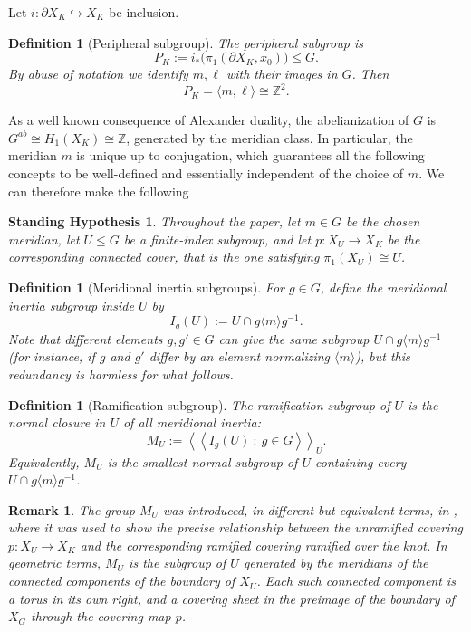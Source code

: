 \documentclass[11pt]{article}
\newtheorem{definition}[theorem]{Definition}
\newtheorem{remark}[theorem]{Remark}
\newtheorem{hyp}{Standing Hypothesis}
\begin{document}
	Let $i:\partial X_K\hookrightarrow X_K$ be inclusion.
	
	\begin{definition}[Peripheral subgroup]
		The \emph{peripheral subgroup} is
		\[ P_K := i_*\big(\pi_1(\partial X_K,x_0)\big)\le G.\]
		By abuse of notation we identify $m,\ell$ with their images in $G$. Then
		\[P_K=\langle m,\ell\rangle \cong \mathbb Z^2.\]
	\end{definition}
	
	As a well known consequence of Alexander duality, the abelianization of $G$ is
	$G^{ab}\cong H_1(X_K)\cong \mathbb Z$, generated by the meridian class. In particular, the meridian $m$ is unique up to conjugation, which guarantees all the following concepts to be well-defined and essentially independent of the choice of $m$. We can therefore make the following
	
	\begin{hyp}
		Throughout the paper, let $m\in G$ be the chosen meridian, let $U\le G$ be a finite-index subgroup, and let $p:X_U\to X_K$ be the corresponding connected cover, that is the one satisfying $\pi_1(X_U)\cong U$.
	\end{hyp}
	
	\begin{definition}[Meridional inertia subgroups]
		For $g\in G$, define the \emph{meridional inertia subgroup} inside $U$ by
		\[ I_g(U):= U\cap g\langle m\rangle g^{-1}.\]
		Note that different elements $g,g'\in G$ can give the same subgroup $U\cap g\langle m\rangle g^{-1}$ (for instance, if $g$ and $g'$ differ by an element normalizing $\langle m\rangle$), but this redundancy is harmless for what follows.
	\end{definition}
	
	\begin{definition}[Ramification subgroup]
		The \emph{ramification subgroup} of $U$ is the normal closure in $U$ of all meridional inertia:
		\[M_U := \left\langle\!\left\langle I_g(U)\ :\ g\in G \right\rangle\!\right\rangle_U.\]
		Equivalently, $M_U$ is the smallest normal subgroup of $U$ containing every $U\cap g\langle m\rangle g^{-1}$.
	\end{definition}
	\begin{remark}
		The group $M_U$ was introduced, in different but equivalent terms, in \cite{PasiniClassifying, PasiniAmbClassSp}, where it was used to show the precise relationship between the unramified covering $p:X_U\to X_K$ and the corresponding ramified covering ramified over the knot. In geometric terms, $M_U$ is the subgroup of $U$ generated by the meridians of the connected components of the boundary of $X_U$. Each such connected component is a torus in its own right, and a covering sheet in the preimage of the boundary of $X_G$ through the covering map $p$.
	\end{remark}
	
\end{document}
